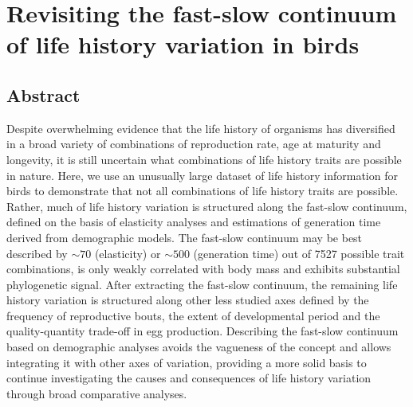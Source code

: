 \chapter[Axes of life history variation]{Revisiting the fast-slow continuum of 
life history variation in birds}\label{ch:LHaxes}

\clearpage

\section*{Abstract}

Despite overwhelming evidence that the life history of organisms has diversified
in a broad variety of combinations of reproduction rate, age at maturity and
longevity, it is still uncertain what combinations of life history traits are
possible in nature. Here, we use an unusually large dataset of life history
information for birds to demonstrate that not all combinations of life history
traits are possible. Rather, much of life history variation is structured along
the fast-slow continuum, defined on the basis of elasticity analyses and
estimations of generation time derived from demographic models. The fast-slow
continuum may be best described by $\sim70$ (elasticity) or $\sim500$ (generation
time) out of 7527 possible trait combinations, is only weakly correlated with
body mass and exhibits substantial phylogenetic signal. After extracting the
fast-slow continuum, the remaining life history variation is structured along
other less studied axes defined by the frequency of reproductive bouts, the
extent of developmental period and the quality-quantity trade-off in egg
production. Describing the fast-slow continuum based on demographic analyses
avoids the vagueness of the concept and allows integrating it with other axes of
variation, providing a more solid basis to continue investigating the causes and
consequences of life history variation through broad comparative analyses.


